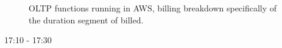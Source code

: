 \begin{figure}
    \begin{center}
        
    \end{center}
    \caption{OLTP \faaasc{} functions running in AWS, billing breakdown specifically of the duration segment of billed.}
\end{figure}

17:10 - 17:30
